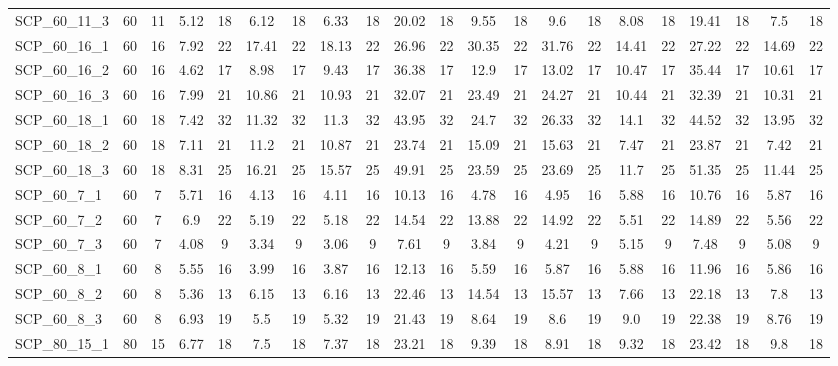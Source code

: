 \begin{sidewaystable}[!ht]
{\begin{tabular}{lcccccccccccccccccccc}
SCP\_60\_11\_3 & 60 & 11 &  \textcolor{blue2}{5.12} & 18 & 6.12 & 18 & 6.33 & 18 & 20.02 & 18 & 9.55 & 18 & 9.6 & 18 & 8.08 & 18 & 19.41 & 18 & 7.5 & 18 \\
SCP\_60\_16\_1 & 60 & 16 &  \textcolor{blue2}{7.92} & 22 & 17.41 & 22 & 18.13 & 22 & 26.96 & 22 & 30.35 & 22 & 31.76 & 22 & 14.41 & 22 & 27.22 & 22 & 14.69 & 22 \\
SCP\_60\_16\_2 & 60 & 16 &  \textcolor{blue2}{4.62} & 17 & 8.98 & 17 & 9.43 & 17 & 36.38 & 17 & 12.9 & 17 & 13.02 & 17 & 10.47 & 17 & 35.44 & 17 & 10.61 & 17 \\
SCP\_60\_16\_3 & 60 & 16 &  \textcolor{blue2}{7.99} & 21 & 10.86 & 21 & 10.93 & 21 & 32.07 & 21 & 23.49 & 21 & 24.27 & 21 & 10.44 & 21 & 32.39 & 21 & 10.31 & 21 \\
SCP\_60\_18\_1 & 60 & 18 &  \textcolor{blue2}{7.42} & 32 & 11.32 & 32 & 11.3 & 32 & 43.95 & 32 & 24.7 & 32 & 26.33 & 32 & 14.1 & 32 & 44.52 & 32 & 13.95 & 32 \\
SCP\_60\_18\_2 & 60 & 18 &  \textcolor{blue2}{7.11} & 21 & 11.2 & 21 & 10.87 & 21 & 23.74 & 21 & 15.09 & 21 & 15.63 & 21 & 7.47 & 21 & 23.87 & 21 & 7.42 & 21 \\
SCP\_60\_18\_3 & 60 & 18 &  \textcolor{blue2}{8.31} & 25 & 16.21 & 25 & 15.57 & 25 & 49.91 & 25 & 23.59 & 25 & 23.69 & 25 & 11.7 & 25 & 51.35 & 25 & 11.44 & 25 \\
SCP\_60\_7\_1 & 60 & 7 & 5.71 & 16 & 4.13 & 16 &  \textcolor{blue2}{4.11} & 16 & 10.13 & 16 & 4.78 & 16 & 4.95 & 16 & 5.88 & 16 & 10.76 & 16 & 5.87 & 16 \\
SCP\_60\_7\_2 & 60 & 7 & 6.9 & 22 & 5.19 & 22 &  \textcolor{blue2}{5.18} & 22 & 14.54 & 22 & 13.88 & 22 & 14.92 & 22 & 5.51 & 22 & 14.89 & 22 & 5.56 & 22 \\
SCP\_60\_7\_3 & 60 & 7 & 4.08 & 9 & 3.34 & 9 &  \textcolor{blue2}{3.06} & 9 & 7.61 & 9 & 3.84 & 9 & 4.21 & 9 & 5.15 & 9 & 7.48 & 9 & 5.08 & 9 \\
SCP\_60\_8\_1 & 60 & 8 & 5.55 & 16 & 3.99 & 16 &  \textcolor{blue2}{3.87} & 16 & 12.13 & 16 & 5.59 & 16 & 5.87 & 16 & 5.88 & 16 & 11.96 & 16 & 5.86 & 16 \\
SCP\_60\_8\_2 & 60 & 8 &  \textcolor{blue2}{5.36} & 13 & 6.15 & 13 & 6.16 & 13 & 22.46 & 13 & 14.54 & 13 & 15.57 & 13 & 7.66 & 13 & 22.18 & 13 & 7.8 & 13 \\
SCP\_60\_8\_3 & 60 & 8 & 6.93 & 19 & 5.5 & 19 &  \textcolor{blue2}{5.32} & 19 & 21.43 & 19 & 8.64 & 19 & 8.6 & 19 & 9.0 & 19 & 22.38 & 19 & 8.76 & 19 \\
SCP\_80\_15\_1 & 80 & 15 &  \textcolor{blue2}{6.77} & 18 & 7.5 & 18 & 7.37 & 18 & 23.21 & 18 & 9.39 & 18 & 8.91 & 18 & 9.32 & 18 & 23.42 & 18 & 9.8 & 18 \\

\end{tabular}}
\end{sidewaystable}
